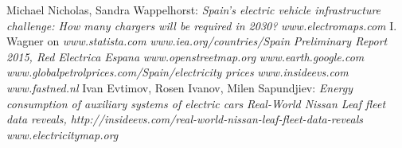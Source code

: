 \documentclass{article}
\begin{document}
\begin{thebibliography}{9}
Michael Nicholas, Sandra Wappelhorst:
\textit{Spain’s electric vehicle infrastructure challenge: How many chargers will be required in 2030?}
\textit{www.electromaps.com}
I. Wagner on
\textit{www.statista.com}
\textit{www.iea.org/countries/Spain}
\textit{Preliminary Report 2015, Red Electrica Espana}
\textit{www.openstreetmap.org}
\textit{www.earth.google.com}
\textit{www.globalpetrolprices.com/Spain/electricity prices}
\textit{www.insideevs.com}
\textit{www.fastned.nl}
Ivan Evtimov, Rosen Ivanov, Milen Sapundjiev:
\textit{Energy consumption of auxiliary systems of electric cars}
\textit{Real-World Nissan Leaf fleet data reveals,
http://insideevs.com/real-world-nissan-leaf-fleet-data-reveals}
\textit{www.electricitymap.org}
\end{thebibliography}
\end{document}
